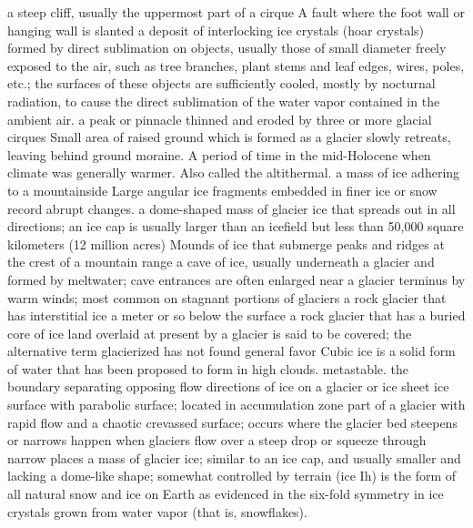 a steep cliff, usually the uppermost part of a cirque
 A fault where the foot wall or hanging wall is slanted
 a deposit of interlocking ice crystals (hoar crystals) formed by direct sublimation on objects, usually those of small diameter freely exposed to the air, such as tree branches, plant stems and leaf edges, wires, poles, etc.; the surfaces of these objects are sufficiently cooled, mostly by nocturnal radiation, to cause the direct sublimation of the water vapor contained in the ambient air.
 a peak or pinnacle thinned and eroded by three or more glacial cirques
 Small area of raised ground which is formed as a glacier slowly retreats, leaving behind ground moraine.
 A period of time in the mid-Holocene when climate was generally warmer. Also called the altithermal.
 a mass of ice adhering to a mountainside
 Large angular ice fragments embedded in finer ice or snow record abrupt changes.
 a dome-shaped mass of glacier ice that spreads out in all directions; an ice cap is usually larger than an icefield but less than 50,000 square kilometers (12 million acres)
 Mounds of ice that submerge peaks and ridges at the crest of a mountain range
 a cave of ice, usually underneath a glacier and formed by meltwater; cave entrances are often enlarged near a glacier terminus by warm winds; most common on stagnant portions of glaciers
 a rock glacier that has interstitial ice a meter or so below the surface
 a rock glacier that has a buried core of ice
 land overlaid at present by a glacier is said to be covered; the alternative term glacierized has not found general favor
 Cubic ice is a solid form of water that has been proposed to form in high clouds. metastable.
 the boundary separating opposing flow directions of ice on a glacier or ice sheet
 ice surface with parabolic surface; located in accumulation zone
 part of a glacier with rapid flow and a chaotic crevassed surface; occurs where the glacier bed steepens or narrows
 happen when glaciers flow over a steep drop or squeeze through narrow places
 a mass of glacier ice; similar to an ice cap, and usually smaller and lacking a dome-like shape; somewhat controlled by terrain
 (ice Ih) is the form of all natural snow and ice on Earth as evidenced in the six-fold symmetry in ice crystals grown from water vapor (that is, snowflakes).

